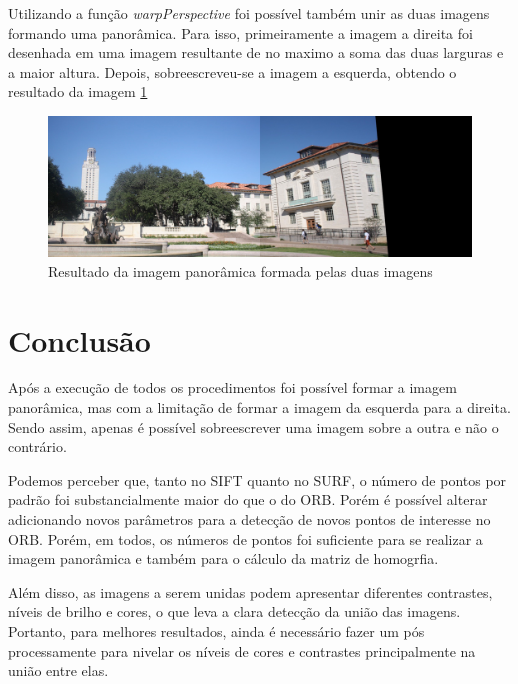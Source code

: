 \documentclass{article}
\begin{document}
Utilizando a função \textit{warpPerspective} foi possível também unir as duas imagens formando uma panorâmica. Para isso, primeiramente a imagem a direita foi desenhada em uma imagem resultante de no maximo a soma das duas larguras e a maior altura. Depois, sobreescreveu-se a imagem a esquerda, obtendo o resultado da imagem \ref{Fig:resultado}

\begin{figure}[!htb]
  \centering
  \includegraphics[width=.8\linewidth]{result.jpeg}
  \caption{Resultado da imagem panorâmica formada pelas duas imagens}\label{Fig:resultado}
\end{figure}

\section{Conclusão}

Após a execução de todos os procedimentos foi possível formar a imagem panorâmica, mas com a limitação de formar a imagem da esquerda para a direita. Sendo assim, apenas é possível sobreescrever uma imagem sobre a outra e não o contrário.

Podemos perceber que, tanto no SIFT quanto no SURF, o número de pontos por padrão foi substancialmente maior do que o do ORB. Porém é possível alterar adicionando novos parâmetros para a detecção de novos pontos de interesse no ORB. Porém, em todos, os números de pontos foi suficiente para se realizar a imagem panorâmica e também para o cálculo da matriz de homogrfia.

Além disso, as imagens a serem unidas podem apresentar diferentes contrastes, níveis de brilho e cores, o que leva a clara detecção da união das imagens. Portanto, para melhores resultados, ainda é necessário fazer um pós processamente para nivelar os níveis de cores e contrastes principalmente na união entre elas.



\end{document}
